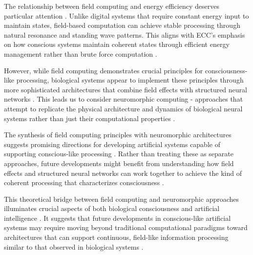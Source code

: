 The relationship between field computing and energy efficiency deserves particular attention \cite{Haken2020}. Unlike digital systems that require constant energy input to maintain states, field-based computation can achieve stable processing through natural resonance and standing wave patterns. This aligns with ECC's emphasis on how conscious systems maintain coherent states through efficient energy management rather than brute force computation \cite{McFadden2018}.

However, while field computing demonstrates crucial principles for consciousness-like processing, biological systems appear to implement these principles through more sophisticated architectures that combine field effects with structured neural networks \cite{Nikolic2019}. This leads us to consider neuromorphic computing - approaches that attempt to replicate the physical architecture and dynamics of biological neural systems rather than just their computational properties \cite{Pockett2021}.

The synthesis of field computing principles with neuromorphic architectures suggests promising directions for developing artificial systems capable of supporting conscious-like processing \cite{Pribram2017}. Rather than treating these as separate approaches, future developments might benefit from understanding how field effects and structured neural networks can work together to achieve the kind of coherent processing that characterizes consciousness \cite{Raychowdhury2020}.

This theoretical bridge between field computing and neuromorphic approaches illuminates crucial aspects of both biological consciousness and artificial intelligence \cite{Verschure2019}. It suggests that future developments in conscious-like artificial systems may require moving beyond traditional computational paradigms toward architectures that can support continuous, field-like information processing similar to that observed in biological systems \cite{Werbos2018}.